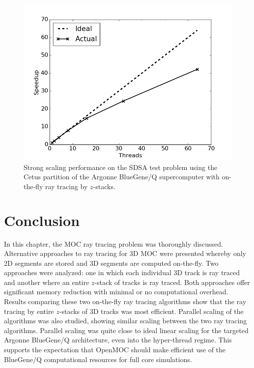 \begin{figure}[ht!]
	\centering
	\includegraphics[width=0.75\linewidth]{figures/results/performance/fs-parallel-scaling-stacks-cetus.png}
	\caption{Strong scaling performance on the SDSA test problem using the Cetus partition of the Argonne BlueGene/Q supercomputer with on-the-fly ray tracing by $z$-stacks.}
	\label{fig:rt-parallel-fs-cetus}
\end{figure}

%
\section{Conclusion} 
\label{sec:rt-conclusion}

In this chapter, the \ac{MOC} ray tracing problem was thoroughly discussed. Alternative approaches to ray tracing for 3D \ac{MOC} were presented whereby only 2D segments are stored and 3D segments are computed on-the-fly. Two approaches were analyzed: one in which each individual 3D track is ray traced and another where an entire $z$-stack of tracks is ray traced. Both approaches offer significant memory reduction with minimal or no computational overhead. Results comparing these two on-the-fly ray tracing algorithms show that the ray tracing by entire $z$-stacks of 3D tracks was most efficient. Parallel scaling of the algorithms was also studied, showing similar scaling between the two ray tracing algorithms. Parallel scaling was quite close to ideal linear scaling for the targeted Argonne BlueGene/Q architecture, even into the hyper-thread regime. This supports the expectation that OpenMOC should make efficient use of the BlueGene/Q computational resources for full core simulations.

